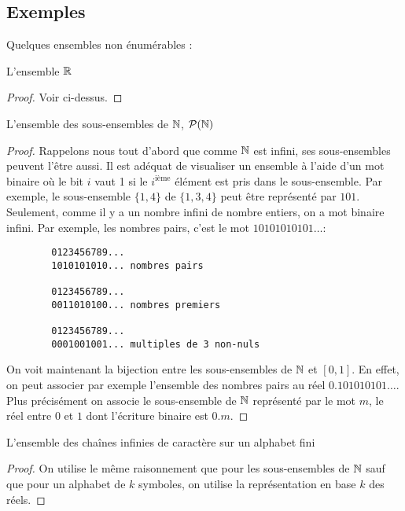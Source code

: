 \subsection{Exemples}
\label{subsec:exemples_non_enum}

Quelques ensembles non énumérables :
\begin{myexem}
 L'ensemble $\mathbb{R}$
 \begin{proof}
   Voir ci-dessus.
 \end{proof}
\end{myexem}

\begin{myexem}
 L'ensemble des sous-ensembles de $\mathbb{N}$, $\mathcal{P}(\mathbb{N})$
 \begin{proof}
   Rappelons nous tout d'abord que comme $\mathbb{N}$ est infini, ses sous-ensembles peuvent l'être aussi.
   Il est adéquat de visualiser un ensemble à l'aide d'un mot binaire
   où le bit $i$ vaut 1 si le $i^{\mathrm{ième}}$ élément est pris dans le sous-ensemble.
   Par exemple, le sous-ensemble $\{1,4\}$ de $\{1,3,4\}$ peut être représenté par $101$.
   Seulement, comme il y a un nombre infini de nombre entiers, on a mot binaire infini.
   Par exemple, les nombres pairs, c'est le mot $10101010101\ldots$:
   \begin{verbatim}
		0123456789...
		1010101010... nombres pairs
		
		0123456789...
		0011010100... nombres premiers
		
		0123456789...
		0001001001... multiples de 3 non-nuls
    \end{verbatim}
   On voit maintenant la bijection entre les sous-ensembles de $\mathbb{N}$ et $[0,1]$.
   En effet, on peut associer par exemple l'ensemble des nombres pairs au réel $0.101010101\ldots$.
   Plus précisément on associe le sous-ensemble de $\mathbb{N}$ représenté par le mot $m$, le réel entre $0$ et $1$ dont l'écriture binaire est $0.m$.
 \end{proof}
\end{myexem}

\begin{myexem}
 L'ensemble des chaînes infinies de caractère sur un alphabet fini
 \begin{proof}
   On utilise le même raisonnement que pour les sous-ensembles de $\mathbb{N}$ sauf que pour un alphabet de $k$ symboles,
   on utilise la représentation en base $k$ des réels.
 \end{proof}
\end{myexem}


